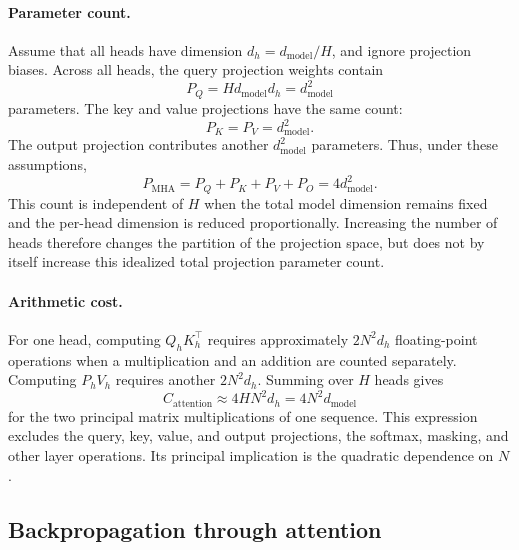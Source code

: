 \paragraph{Parameter count.}
Assume that all heads have dimension \(d_h=d_{\mathrm{model}}/H\), and
ignore projection biases. Across all heads, the query projection weights
contain
\begin{equation}
    P_Q=H d_{\mathrm{model}}d_h
    =d_{\mathrm{model}}^2
    \label{eq:attn-mha-query-parameters}
\end{equation}
parameters. The key and value projections have the same count:
\begin{equation}
    P_K=P_V=d_{\mathrm{model}}^2.
    \label{eq:attn-mha-key-value-parameters}
\end{equation}
The output projection contributes another \(d_{\mathrm{model}}^2\)
parameters. Thus, under these assumptions,
\begin{equation}
    P_{\mathrm{MHA}}
    =
    P_Q+P_K+P_V+P_O
    =
    4d_{\mathrm{model}}^2.
    \label{eq:attn-mha-parameter-count}
\end{equation}
This count is independent of \(H\) when the total model dimension remains
fixed and the per-head dimension is reduced proportionally. Increasing
the number of heads therefore changes the partition of the projection
space, but does not by itself increase this idealized total projection
parameter count.

\paragraph{Arithmetic cost.}
For one head, computing \(Q_hK_h^\top\) requires approximately
\(2N^2d_h\) floating-point operations when a multiplication and an
addition are counted separately. Computing \(P_hV_h\) requires another
\(2N^2d_h\). Summing over \(H\) heads gives
\begin{equation}
    C_{\mathrm{attention}}
    \approx
    4HN^2d_h
    =
    4N^2d_{\mathrm{model}}
    \label{eq:attn-mha-flops}
\end{equation}
for the two principal matrix multiplications of one sequence. This
expression excludes the query, key, value, and output projections, the
softmax, masking, and other layer operations. Its principal implication
is the quadratic dependence on \(N\).

\subsection{Backpropagation through attention}
\label{subsec:attn-backpropagation}

